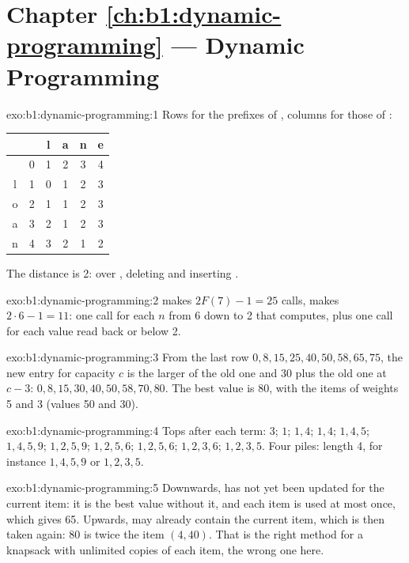 \section*{Chapter \ref{ch:b1:dynamic-programming} --- Dynamic Programming}

\begin{solution}{exo:b1:dynamic-programming:1}
Rows for the prefixes of , columns for those of :
\begin{center}
\begin{tabular}{c|ccccc}
 & & l & a & n & e \\ \hline
 & 0 & 1 & 2 & 3 & 4 \\
l & 1 & 0 & 1 & 2 & 3 \\
o & 2 & 1 & 1 & 2 & 3 \\
a & 3 & 2 & 1 & 2 & 3 \\
n & 4 & 3 & 2 & 1 & 2
\end{tabular}
\end{center}
The distance is 2:  over , deleting  and inserting .
\end{solution}

\begin{solution}{exo:b1:dynamic-programming:2}
 makes $2F(7) - 1 = 25$ calls,  makes $2 \cdot 6 - 1 = 11$: one call for each $n$
from 6 down to 2 that computes, plus one call for each value read back or below 2.
\end{solution}

\begin{solution}{exo:b1:dynamic-programming:3}
From the last row $0, 8, 15, 25, 40, 50, 58, 65, 75$, the new entry for capacity $c$ is the larger of the old one and
30 plus the old one at $c - 3$: $0, 8, 15, 30, 40, 50, 58, 70, 80$. The best value is 80, with the items of weights 5 and
3 (values 50 and 30).
\end{solution}

\begin{solution}{exo:b1:dynamic-programming:4}
Tops after each term: $3$; $1$; $1, 4$; $1, 4$; $1, 4, 5$; $1, 4, 5, 9$; $1, 2, 5, 9$; $1, 2, 5, 6$; $1, 2, 5, 6$; $1, 2,
3, 6$; $1, 2, 3, 5$. Four piles: length 4, for instance $1, 4, 5, 9$ or $1, 2, 3, 5$.
\end{solution}

\begin{solution}{exo:b1:dynamic-programming:5}
Downwards,  has not yet been updated for the current item: it is the best value without it, and each
item is used at most once, which gives 65. Upwards,  may already contain the current item, which is
then taken again: 80 is twice the item $(4, 40)$. That is the right method for a knapsack with unlimited copies of each
item, the wrong one here.
\end{solution}

